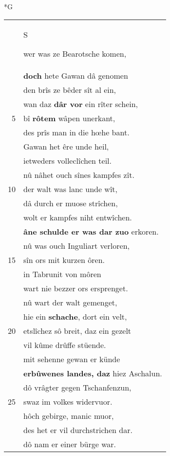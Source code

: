 \documentclass[8pt,a4paper,notitlepage]{article}
\begin{document}
\newpage
\begin{table}[ht]
\begin{minipage}[t]{0.5\linewidth}
\small
\begin{center}*G
\end{center}
\begin{tabular}{rl}
 & \begin{Large}S\end{Large}wer was ze Bearotsche komen,\\ 
 & \textbf{doch} hete Gawan dâ genomen\\ 
 & den brîs ze bêder sît al ein,\\ 
 & wan daz \textbf{dâr vor} ein rîter schein,\\ 
5 & bî \textbf{rôtem} wâpen unerkant,\\ 
 & des prîs man in die hœhe bant.\\ 
 & Gawan het êre unde heil,\\ 
 & ietweders volleclîchen teil.\\ 
 & nû nâhet ouch sînes kampfes zît.\\ 
10 & der walt was lanc unde wît,\\ 
 & dâ durch er muose strîchen,\\ 
 & wolt er kampfes niht entwîchen.\\ 
 & \textbf{âne schulde er was dar zuo} erkoren.\\ 
 & nû was ouch Inguliart verloren,\\ 
15 & sîn ors mit kurzen ôren.\\ 
 & in Tabrunit von môren\\ 
 & wart nie bezzer ors ersprenget.\\ 
 & nû wart der walt gemenget,\\ 
 & hie ein \textbf{schache}, dort ein velt,\\ 
20 & etslîchez sô breit, daz ein gezelt\\ 
 & vil kûme drûffe stüende.\\ 
 & mit sehenne gewan er künde\\ 
 & \textbf{erbûwenes landes, daz} hiez Aschalun.\\ 
 & dô vrâgter gegen Tschanfenzun,\\ 
25 & swaz im volkes widervuor.\\ 
 & hôch gebirge, manic muor,\\ 
 & des het er vil durchstrichen dar.\\ 
 & dô nam er einer bürge war.\\ 

\end{tabular}
\end{minipage}
\end{table}
\end{document}
